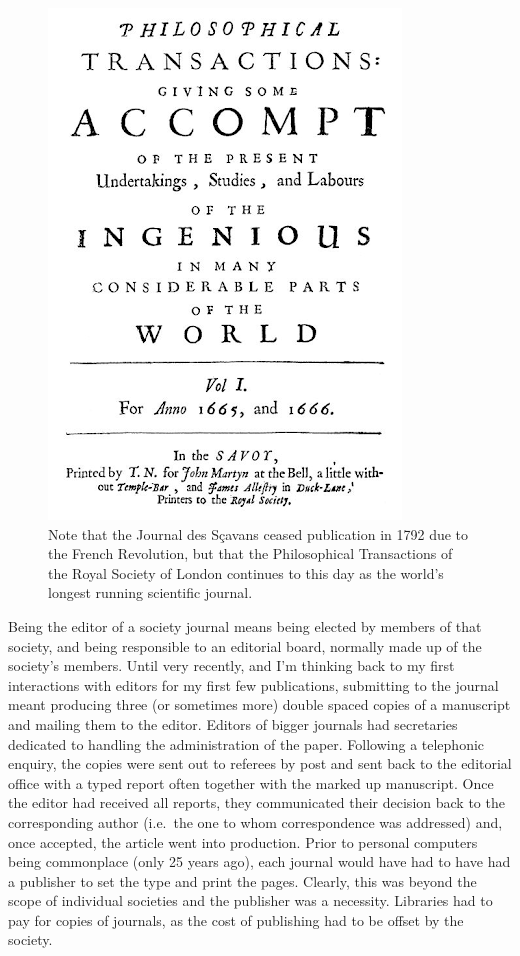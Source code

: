 \documentclass[
]{krantz}
\begin{document}
\begin{figure}
\includegraphics[width=0.5\linewidth]{figures/PhilTransRoySoc} \caption{Note that the Journal des Sçavans ceased publication in 1792 due to the French Revolution, but that the Philosophical Transactions of the Royal Society of London continues to this day as the world's longest running scientific journal.}\label{fig:PhilTransRoySoc}
\end{figure}

Being the editor of a society journal means being elected by members of that society, and being responsible to an editorial board, normally made up of the society's members. Until very recently, and I'm thinking back to my first interactions with editors for my first few publications, submitting to the journal meant producing three (or sometimes more) double spaced copies of a manuscript and mailing them to the editor. Editors of bigger journals had secretaries dedicated to handling the administration of the paper. Following a telephonic enquiry, the copies were sent out to referees by post and sent back to the editorial office with a typed report often together with the marked up manuscript. Once the editor had received all reports, they communicated their decision back to the corresponding author (i.e.~the one to whom correspondence was addressed) and, once accepted, the article went into production. Prior to personal computers being commonplace (only 25 years ago), each journal would have had to have had a publisher to set the type and print the pages. Clearly, this was beyond the scope of individual societies and the publisher was a necessity. Libraries had to pay for copies of journals, as the cost of publishing had to be offset by the society.
\end{document}
